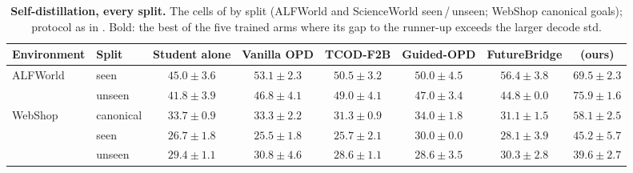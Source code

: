 \begin{table}[t]
\centering
\caption{\textbf{Self-distillation, every split.} The cells of  by split (ALFWorld and ScienceWorld seen\,/\,unseen; WebShop canonical goals); protocol as in . Bold: the best of the five trained arms where its gap to the runner-up exceeds the larger decode std.}
\label{tab:self-full}
\scriptsize
\setlength{\tabcolsep}{3.5pt}
\begin{tabular}{@{}llcccccc@{}}
\toprule
Environment & Split & Student alone & Vanilla OPD & TCOD-F2B & Guided-OPD & FutureBridge & \method{} (ours) \\
\midrule\midrule
\multirow{2}{*}{ALFWorld} & seen & $45.0{\pm}3.6$ & $53.1{\pm}2.3$ & $50.5{\pm}3.2$ & $50.0{\pm}4.5$ & $56.4{\pm}3.8$ & $\mathbf{69.5{\pm}2.3}$ \\
 & unseen & $41.8{\pm}3.9$ & $46.8{\pm}4.1$ & $49.0{\pm}4.1$ & $47.0{\pm}3.4$ & $44.8{\pm}0.0$ & $\mathbf{75.9{\pm}1.6}$ \\
\addlinespace[3pt]
WebShop & canonical & $33.7{\pm}0.9$ & $33.3{\pm}2.2$ & $31.3{\pm}0.9$ & $34.0{\pm}1.8$ & $31.1{\pm}1.5$ & $\mathbf{58.1{\pm}2.5}$ \\
\addlinespace[3pt]
\multirow{2}{*}{ScienceWorld} & seen & $26.7{\pm}1.8$ & $25.5{\pm}1.8$ & $25.7{\pm}2.1$ & $30.0{\pm}0.0$ & $28.1{\pm}3.9$ & $\mathbf{45.2{\pm}5.7}$ \\
 & unseen & $29.4{\pm}1.1$ & $30.8{\pm}4.6$ & $28.6{\pm}1.1$ & $28.6{\pm}3.5$ & $30.3{\pm}2.8$ & $\mathbf{39.6{\pm}2.7}$ \\
\bottomrule
\end{tabular}
\end{table}
